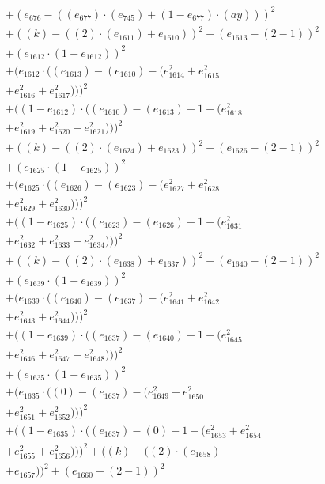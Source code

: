 \documentclass[10pt, a4paper]{article}
\begin{document}
\begin{align*}
& + (e_{676} - ((e_{677})  \cdot  (e_{745}) + (1 - e_{677})  \cdot  (ay)))^{2} \\
& + ((k) - ((2)  \cdot  (e_{1611}) + e_{1610}))^{2} + (e_{1613} - (2 - 1))^{2} \\
& + (e_{1612}  \cdot  (1 - e_{1612}))^{2} \\
& + (e_{1612}  \cdot  ((e_{1613}) - (e_{1610}) - (e_{1614}^{2} + e_{1615}^{2} \\
& + e_{1616}^{2} + e_{1617}^{2})))^{2} \\
& + ((1 - e_{1612})  \cdot  ((e_{1610}) - (e_{1613}) - 1 - (e_{1618}^{2} \\
& + e_{1619}^{2} + e_{1620}^{2} + e_{1621}^{2})))^{2} \\
& + ((k) - ((2)  \cdot  (e_{1624}) + e_{1623}))^{2} + (e_{1626} - (2 - 1))^{2} \\
& + (e_{1625}  \cdot  (1 - e_{1625}))^{2} \\
& + (e_{1625}  \cdot  ((e_{1626}) - (e_{1623}) - (e_{1627}^{2} + e_{1628}^{2} \\
& + e_{1629}^{2} + e_{1630}^{2})))^{2} \\
& + ((1 - e_{1625})  \cdot  ((e_{1623}) - (e_{1626}) - 1 - (e_{1631}^{2} \\
& + e_{1632}^{2} + e_{1633}^{2} + e_{1634}^{2})))^{2} \\
& + ((k) - ((2)  \cdot  (e_{1638}) + e_{1637}))^{2} + (e_{1640} - (2 - 1))^{2} \\
& + (e_{1639}  \cdot  (1 - e_{1639}))^{2} \\
& + (e_{1639}  \cdot  ((e_{1640}) - (e_{1637}) - (e_{1641}^{2} + e_{1642}^{2} \\
& + e_{1643}^{2} + e_{1644}^{2})))^{2} \\
& + ((1 - e_{1639})  \cdot  ((e_{1637}) - (e_{1640}) - 1 - (e_{1645}^{2} \\
& + e_{1646}^{2} + e_{1647}^{2} + e_{1648}^{2})))^{2} \\
& + (e_{1635}  \cdot  (1 - e_{1635}))^{2} \\
& + (e_{1635}  \cdot  ((0) - (e_{1637}) - (e_{1649}^{2} + e_{1650}^{2} \\
& + e_{1651}^{2} + e_{1652}^{2})))^{2} \\
& + ((1 - e_{1635})  \cdot  ((e_{1637}) - (0) - 1 - (e_{1653}^{2} + e_{1654}^{2} \\
& + e_{1655}^{2} + e_{1656}^{2})))^{2} + ((k) - ((2)  \cdot  (e_{1658}) \\
& + e_{1657}))^{2} + (e_{1660} - (2 - 1))^{2} \\

\end{align*}
\end{document}
